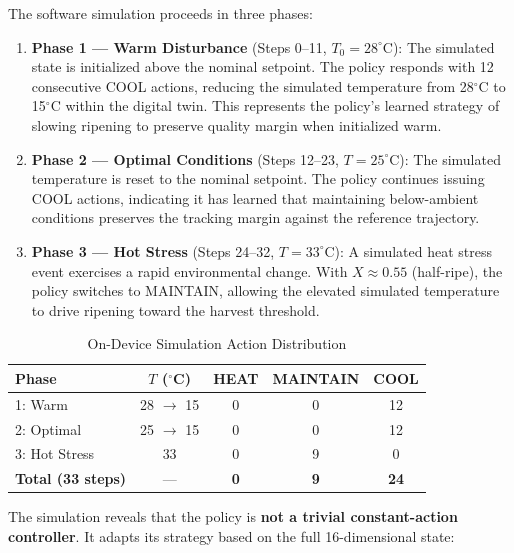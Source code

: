 The software simulation proceeds in three phases:

\begin{enumerate}
    \item \textbf{Phase 1 --- Warm Disturbance} (Steps 0--11, $T_0 = 28^\circ$C): The simulated state is initialized above the nominal setpoint. The policy responds with 12 consecutive COOL actions, reducing the simulated temperature from 28$^\circ$C to 15$^\circ$C within the digital twin. This represents the policy's learned strategy of slowing ripening to preserve quality margin when initialized warm.

    \item \textbf{Phase 2 --- Optimal Conditions} (Steps 12--23, $T = 25^\circ$C): The simulated temperature is reset to the nominal setpoint. The policy continues issuing COOL actions, indicating it has learned that maintaining below-ambient conditions preserves the tracking margin against the reference trajectory.

    \item \textbf{Phase 3 --- Hot Stress} (Steps 24--32, $T = 33^\circ$C): A simulated heat stress event exercises a rapid environmental change. With $X \approx 0.55$ (half-ripe), the policy switches to MAINTAIN, allowing the elevated simulated temperature to drive ripening toward the harvest threshold.
\end{enumerate}

\begin{table}[htbp]
\caption{On-Device Simulation Action Distribution}
\label{tab:sim_actions}
\centering
\begin{tabular}{@{}lcccc@{}}
\toprule
\textbf{Phase} & \textbf{$T$ ($^\circ$C)} & \textbf{HEAT} & \textbf{MAINTAIN} & \textbf{COOL} \\
\midrule
1: Warm & 28 $\to$ 15 & 0 & 0 & 12 \\
2: Optimal & 25 $\to$ 15 & 0 & 0 & 12 \\
3: Hot Stress & 33 & 0 & 9 & 0 \\
\midrule
\textbf{Total (33 steps)} & --- & \textbf{0} & \textbf{9} & \textbf{24} \\
\bottomrule
\end{tabular}
\end{table}

The simulation reveals that the policy is \textbf{not a trivial constant-action controller}. It adapts its strategy based on the full 16-dimensional state:

